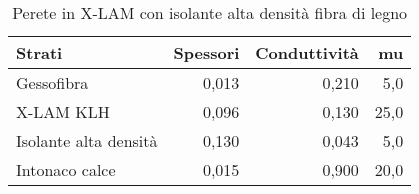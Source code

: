 \begin{table}[H]
\centering
\caption{Perete in X-LAM con isolante alta densità fibra di legno}
\begin{tabular}{lrrr}
\toprule
                                    Strati & Spessori & Conduttività  &    mu \\
\midrule
                                Gessofibra &    0,013 &                0,210 &   5,0 \\
                                 X-LAM KLH &    0,096 &                0,130 &  25,0 \\
 Isolante alta densità &    0,130 &                0,043 &   5,0 \\
                            Intonaco calce &    0,015 &                0,900 &  20,0 \\
\bottomrule
\end{tabular}
\end{table}
